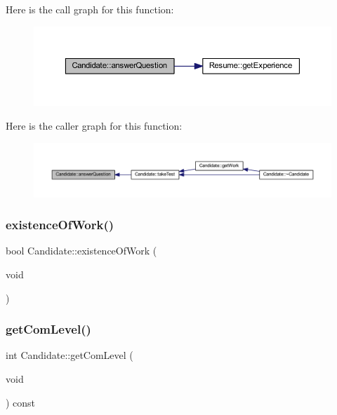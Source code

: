 Here is the call graph for this function\+:
\nopagebreak
\begin{figure}[H]
\begin{center}
\leavevmode
\includegraphics[width=350pt]{class_candidate_aa0d4d9afae45b7ce3a3808af2bfba228_cgraph}
\end{center}
\end{figure}
Here is the caller graph for this function\+:
\nopagebreak
\begin{figure}[H]
\begin{center}
\leavevmode
\includegraphics[width=350pt]{class_candidate_aa0d4d9afae45b7ce3a3808af2bfba228_icgraph}
\end{center}
\end{figure}
\hypertarget{class_candidate_ae246e50a0bd6b9fc03a3579dbd178aad}{}\label{class_candidate_ae246e50a0bd6b9fc03a3579dbd178aad} 
\subsubsection{\texorpdfstring{existence\+Of\+Work()}{existenceOfWork()}}
{\footnotesize\ttfamily bool Candidate\+::existence\+Of\+Work (\begin{DoxyParamCaption}\item[{void}]{ }\end{DoxyParamCaption})\hspace{0.3cm}{\ttfamily [inline]}}

\hypertarget{class_candidate_a12bd0777e1b813f1caa683832b28c8f6}{}\label{class_candidate_a12bd0777e1b813f1caa683832b28c8f6} 
\subsubsection{\texorpdfstring{get\+Com\+Level()}{getComLevel()}}
{\footnotesize\ttfamily int Candidate\+::get\+Com\+Level (\begin{DoxyParamCaption}\item[{void}]{ }\end{DoxyParamCaption}) const\hspace{0.3cm}{\ttfamily [inline]}}

